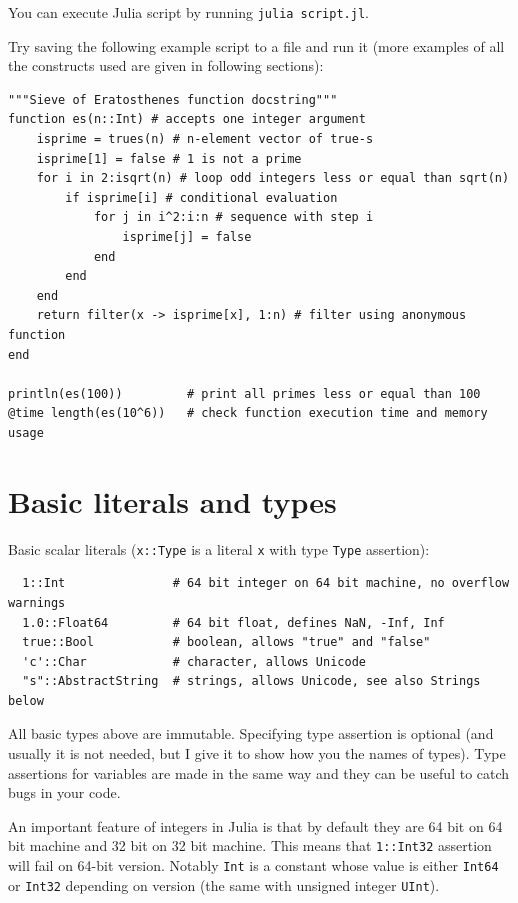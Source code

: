 \documentclass[10pt,a4paper]{article}
\begin{document}
You can execute Julia script by running \lstinline|julia script.jl|.

Try saving the following example script to a file and run it (more examples of all the constructs used are given in following sections):
\begin{lstlisting}
"""Sieve of Eratosthenes function docstring"""
function es(n::Int) # accepts one integer argument
    isprime = trues(n) # n-element vector of true-s
    isprime[1] = false # 1 is not a prime
    for i in 2:isqrt(n) # loop odd integers less or equal than sqrt(n)
        if isprime[i] # conditional evaluation
            for j in i^2:i:n # sequence with step i
                isprime[j] = false
            end
        end
    end
    return filter(x -> isprime[x], 1:n) # filter using anonymous function
end

println(es(100))         # print all primes less or equal than 100
@time length(es(10^6))   # check function execution time and memory usage
\end{lstlisting}

\section{Basic literals and types}
Basic scalar literals (\lstinline|x::Type| is a literal \lstinline|x| with type \lstinline|Type| assertion):
\begin{lstlisting}
  1::Int               # 64 bit integer on 64 bit machine, no overflow warnings
  1.0::Float64         # 64 bit float, defines NaN, -Inf, Inf
  true::Bool           # boolean, allows "true" and "false"
  'c'::Char            # character, allows Unicode
  "s"::AbstractString  # strings, allows Unicode, see also Strings below
\end{lstlisting}
All basic types above are immutable.
Specifying type assertion is optional (and usually it is not needed, but I give it to show how you the names of types).
Type assertions for variables are made in the same way and they can be useful to catch bugs in your code.

An important feature of integers in Julia is that by default they are 64 bit on 64 bit machine and 32 bit on 32 bit machine. This means that \lstinline|1::Int32| assertion will fail on 64-bit version. Notably \lstinline|Int| is a constant whose value is either \lstinline|Int64| or \lstinline|Int32| depending on version (the same with unsigned integer \lstinline|UInt|).
\end{document}
